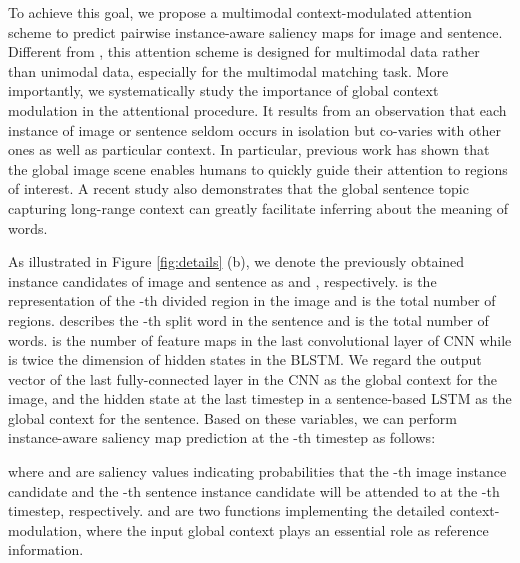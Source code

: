 \documentclass[10pt,twocolumn,letterpaper]{article}
\begin{document}
To achieve this goal,
we propose a multimodal context-modulated attention scheme
to predict pairwise instance-aware saliency maps for image and sentence.
Different from \cite{xu2015show},
this attention scheme is designed for multimodal data rather than unimodal data,
especially for the multimodal matching task.
More importantly, we systematically study the importance of global context modulation
in the attentional procedure.
It results from an observation that
each instance of image or sentence seldom occurs in isolation but co-varies with other
ones as well as particular context.
In particular, previous work \cite{oliva2007role} has shown that the global image scene
enables humans to quickly guide their attention to regions of interest.
A recent study \cite{ghosh2016contextual} also demonstrates that the
global sentence topic capturing long-range context can greatly
facilitate inferring about the meaning of words.

















As illustrated in Figure \ref{fig:details} (b),
we denote the previously obtained instance candidates of image and sentence
as 
and , respectively.
 is the representation of the -th divided region in the image
and  is the total number of regions.
 describes the -th split word in the sentence
and  is the total number of words.
 is the number of feature maps in the last convolutional layer of CNN
while  is twice the dimension
of hidden states in the BLSTM.
We regard the output vector of the last fully-connected layer in the CNN
as the global context  for the image,
and the hidden state at the last timestep in a sentence-based LSTM as
the global context  for the sentence.
Based on these variables, we can perform
instance-aware saliency map prediction at the -th timestep as follows:

where  and  are saliency values indicating probabilities that the -th image instance candidate
and the -th sentence instance candidate
will be attended to at the -th timestep, respectively.
 and 
are two functions implementing the detailed context-modulation,
where the input global context plays an essential role
as reference information.
\end{document}
